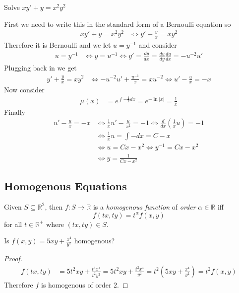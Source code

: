 \documentclass[notes.tex]{subfiles}
\begin{document}
\begin{exercise}
    Solve $xy' + y = x^2y^2$
\end{exercise}
\begin{solution}
    First we need to write this in the standard form of a Bernoulli equation so
    \begin{align*}
        xy' + y = x^2y^2
        &\iff y' + \frac{y}{x} = xy^2
    \end{align*}
    Therefore it is Bernoulli and we let $u = y^{-1}$ and consider 
    \begin{align*}
        u = y^{-1}
        &\iff y = u^{-1}
        \iff y' = \frac{dy}{dx} = \frac{du}{dy}\frac{du}{dx} = -u^{-2}u'
    \end{align*}
    Plugging back in we get
    \begin{align*}
        y' + \frac{y}{x} = xy^2
        &\iff -u^{-2}u' + \frac{u^{-1}}{x} = xu^{-2}
        \iff u' - \frac{u}{x} = -x
    \end{align*}
    Now consider
    \begin{align*}
        \mu(x)
        &= e^{\int -\frac{1}{x} dx}
        = e^{-\ln|x|}
        = \frac{1}{x}
    \end{align*}
    Finally
    \begin{align*}
        u' - \frac{u}{x} = -x
        &\iff \frac{1}{x}u' - \frac{u}{x^2} = -1
        \iff \frac{d}{dx}\left( \frac{1}{x}u \right) = -1 \\
        &\iff \frac{1}{x}u = \int -dx = C - x \\
        &\iff u = Cx - x^2
        \iff y^{-1} = Cx - x^2 \\
        &\iff y = \frac{1}{Cx - x^2}
    \end{align*}
\end{solution}

\subsection{Homogenous Equations}

\begin{definition}
    Given $S \subseteq \mathbb{R}^2$, then $f\colon S \to \mathbb{R}$ is a \textit{homogenous function} of \textit{order} $\alpha \in \mathbb{R}$ iff
    \[
        f(tx, ty) = t^\alpha f(x, y)
    \]
    for all $t \in \mathbb{R}^+$ where $(tx, ty) \in S$.
\end{definition}

\begin{exercise}
    Is $f(x, y) = 5xy + \frac{x^4}{y^2}$ homogenous?
\end{exercise}
\begin{proof}
    \begin{align*}
        f(tx, ty)
        &= 5t^2xy + \frac{t^4x^4}{t^2y^2}
        = 5t^2xy + \frac{t^2x^4}{y^2}
        = t^2\left( 5xy + \frac{x^4}{y^2} \right)
        = t^2 f(x, y)
    \end{align*}
    Therefore $f$ is homogenous of order $2$.
\end{proof}
\end{document}
